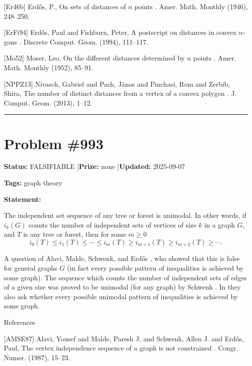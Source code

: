 \documentclass{article}
\begin{document}
[Er46b] Erd\H{o}s, P., On sets of distances of {$n$} points . Amer. Math. Monthly (1946), 248--250.

[ErFi94] Erd\H{o}s, Paul and Fishburn, Peter, A postscript on distances in convex {$n$}-gons . Discrete Comput. Geom. (1994), 111--117.

[Mo52] Moser, Leo, On the different distances determined by {$n$} points . Amer. Math. Monthly (1952), 85--91.

[NPPZ13] Nivasch, Gabriel and Pach, J\'{a}nos and Pinchasi, Rom and Zerbib, Shira, The number of distinct distances from a vertex of a convex polygon . J. Comput. Geom. (2013), 1--12.

\noindent\rule{\linewidth}{0.4pt}


\section{Problem \#993}
\label{prob:993}

\noindent\textbf{Status:} FALSIFIABLE \quad|\quad \textbf{Prize:} none \quad|\quad \textbf{Updated:} 2025-09-07

\noindent\textbf{Tags:} graph theory

\medskip

\noindent\textbf{Statement:}

The independent set sequence of any tree or forest is unimodal. In other words, if $i_k(G)$ counts the number of independent sets of vertices of size $k$ in a graph $G$, and $T$ is any tree or forest, then for some $m\geq 0$ $$i_{0}(T)\leq i_{1}(T)\leq\cdots\leq i_{m}(T)\geq i_{m+1}(T)\geq i_{m+2}(T)\geq\cdots.$$




A question of Alavi, Malde, Schwenk, and Erd\H{o}s \cite{AMSE87}, who showed that this is false for general graphs $G$ (in fact every possible pattern of inequalities is achieved by some graph). The sequence which counts the number of independent sets of edges of a given size was proved to be unimodal (for any graph) by Schwenk \cite{Sc81}. In \cite{AMSE87} they also ask whether every possible unimodal pattern of inequalities is achieved by some graph.




References

[AMSE87] Alavi, Yousef and Malde, Paresh J. and Schwenk, Allen J. and Erd\H{o}s, Paul, The vertex independence sequence of a graph is not constrained . Congr. Numer. (1987), 15--23.
\end{document}
